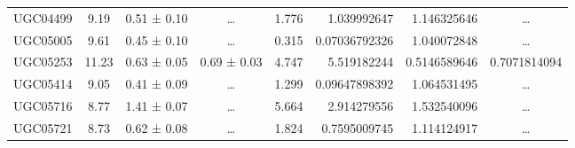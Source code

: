 \documentclass[reprint,%
 amsmath,amssymb,
 aps,
]{revtex4-1}
\begin{document}
\begin{table}[]
\begin{tabular}{cccccrrc}
\rowcolor[HTML]{F3F3F3} 
UGC04499             & 9.19                      & 0.51 ± 0.10           & …                      & 1.776                                                        & 1.039992647                                                           & 1.146325646                                                           & …                                                             \\
\rowcolor[HTML]{F3F3F3} 
UGC05005             & 9.61                      & 0.45 ± 0.10           & …                      & 0.315                                                        & 0.07036792326                                                         & 1.040072848                                                           & …                                                             \\
\rowcolor[HTML]{F3F3F3} 
UGC05253             & 11.23                     & 0.63 ± 0.05           & 0.69 ± 0.03            & 4.747                                                        & 5.519182244                                                           & 0.5146589646                                                          & \multicolumn{1}{r}{\cellcolor[HTML]{F3F3F3}0.7071814094}      \\
\rowcolor[HTML]{F3F3F3} 
UGC05414             & 9.05                      & 0.41 ± 0.09           & …                      & 1.299                                                        & 0.09647898392                                                         & 1.064531495                                                           & …                                                             \\
\rowcolor[HTML]{F3F3F3} 
UGC05716             & 8.77                      & 1.41 ± 0.07           & …                      & 5.664                                                        & 2.914279556                                                           & 1.532540096                                                           & …                                                             \\
\rowcolor[HTML]{F3F3F3} 
UGC05721             & 8.73                      & 0.62 ± 0.08           & …                      & 1.824                                                        & 0.7595009745                                                          & 1.114124917                                                           & …                                                             \\

\end{tabular}
\end{table}
\end{document}
